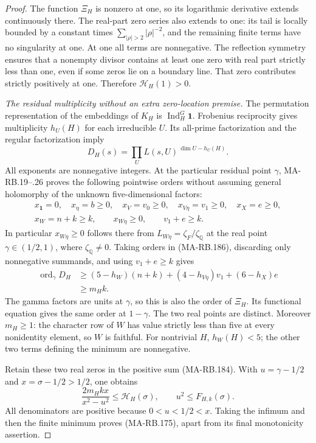 \begin{proof}
The function \(\Xi_H\) is nonzero at one, so its
logarithmic derivative extends continuously there.
The real-part zero series also extends to one:
its tail is locally bounded by a constant times
\(\sum_{|\rho|>2}|\rho|^{-2}\), and the remaining
finite terms have no singularity at one.
At one all terms are nonnegative. The reflection
symmetry ensures that a nonempty divisor contains
at least one zero with real part strictly less
than one, even if some zeros lie on a boundary
line. That zero contributes strictly positively
at one. Therefore \(\mathscr H_H(1)>0\).

\emph{The residual multiplicity without an extra zero-location premise.}
The permutation representation of the embeddings of
\(K_H\) is \(\operatorname{Ind}_H^G\mathbf1\).
Frobenius reciprocity gives multiplicity \(h_U(H)\)
for each irreducible \(U\). Its all-prime
factorization and the regular factorization imply
\[
      D_H(s)=
           \prod_U L(s,U)^{\,\dim U-h_U(H)}.
 \tag{MA-RB.186}
\]
All exponents are nonnegative integers.
At the particular residual point \(\gamma\),
MA-RB.19--.26 proves the following pointwise
orders without assuming general holomorphy of
the unknown five-dimensional factors:
\[
 \begin{gathered}
 x_{\mathbf1}=0,\quad x_\eta=b\ge0,\quad
 x_V=v_0\ge0,\quad x_{V\eta}=v_1\ge0,\quad
 x_X=e\ge0,\\
 x_W=n+k\ge k,\qquad x_{W\eta}\ge0,\qquad
                         v_1+e\ge k.
 \end{gathered}
 \tag{MA-RB.187}
\]
In particular \(x_{W\eta}\ge0\) follows there
from \(L_{W\eta}=\zeta_F/\zeta_{\mathbb Q}\)
at the real point \(\gamma\in(1/2,1)\), where
\(\zeta_{\mathbb Q}\ne0\).
Taking orders in (MA-RB.186), discarding only
nonnegative summands, and using \(v_1+e\ge k\)
gives
\[
 \begin{split}
 \operatorname{ord}_\gamma D_H
   &\ge (5-h_W)(n+k)
         +(4-h_{V\eta})v_1+(6-h_X)e\\
   &\ge m_H k .
 \end{split}
 \tag{MA-RB.188}
\]
The gamma factors are units at \(\gamma\), so
this is also the order of \(\Xi_H\).
Its functional equation gives the same order
at \(1-\gamma\). The two real points are distinct.
Moreover \(m_H\ge1\): the character row of \(W\)
has value strictly less than five at every
nonidentity element, so \(W\) is faithful.
For nontrivial \(H\), \(h_W(H)<5\); the other
two terms defining the minimum are nonnegative.

Retain these two real zeros in the positive sum
(MA-RB.184). With \(u=\gamma-1/2\) and
\(x=\sigma-1/2>1/2\), one obtains
\[
      \frac{2m_H kx}{x^2-u^2}
                      \le\mathscr H_H(\sigma),
       \qquad u^2\le F_{H,k}(\sigma).
 \tag{MA-RB.189}
\]
All denominators are positive because
\(0<u<1/2<x\).
Taking the infimum and then the finite minimum
proves (MA-RB.175), apart from its final
monotonicity assertion.


\end{proof}
